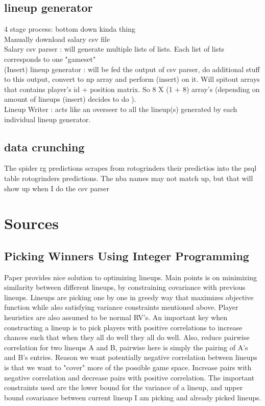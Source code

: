 \documentclass[11pt, oneside]{book}   	%
\begin{document}
\section{lineup generator}
4 stage process: bottom down kinda thing \\
Manually download salary csv file\\
Salary csv parser : will generate multiple lists of lists. Each list of lists corresponds to one "gameset"
\\
(Insert) lineup generator : will be fed the output of csv parser, do additional stuff to this output, convert to np array and perform (insert) on it. Will spitout arrays that contains player's id + position matrix. So  8 X (1 + 8) array's (depending on amount of lineups (insert) decides to do ). \\
Lineup Writer : acts like an overseer to all the lineup(s) generated by each individual lineup generator.  


\section{data crunching}
The spider rg predictions scrapes from rotogrinders their predictios into the psql table rotogrinders predictions. The nba names may not match up, but that will show up when I do the csv parser


\chapter{Sources}
\section{Picking Winners Using Integer Programming}
Paper provides nice solution to optimizing lineups. Main points is on minimizing similarity between different lineups, by constraining covariance with previous lineups. Lineups are picking one by one in greedy way that maximizes objective function while also satisfying variance constraints mentioned above. Player heuristics are also assumed to be normal RV's. An important key when constructing a lineup is to pick players with positive correlations to increase chances such that when they all do well they all do well. Also, reduce pairwise correlation for two lineups A and B, pairwise here is simply the pairing of A's and B's entries. Reason we want potentially negative correlation between lineups is that we want to "cover" more of the possible game space. Increase pairs with negative correlation and decrease pairs with positive correlation. The important constraints used are the lower bound for the variance of a lineup, and upper bound covariance between current lineup I am picking and already picked lineups. 
\end{document}

